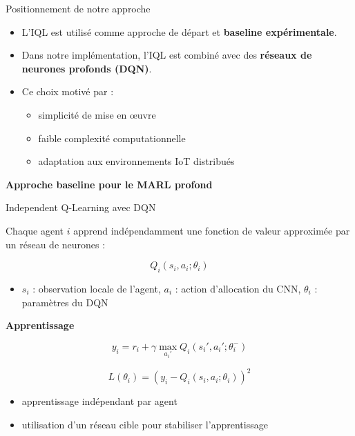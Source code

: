 \documentclass[aspectratio=169]{beamer}
\begin{document}
\begin{frame}{Positionnement de notre approche}

\begin{itemize}
  \item L’IQL est utilisé comme approche de départ et \textbf{baseline expérimentale}.
  \item Dans notre implémentation, l’IQL est combiné avec des \textbf{réseaux de neurones profonds (DQN)}.
  \item Ce choix motivé par :
  \begin{itemize}
    \item simplicité de mise en œuvre
    \item faible complexité computationnelle
    \item adaptation aux environnements IoT distribués
  \end{itemize}
\end{itemize}

\bigskip
\textbf{Approche baseline pour le MARL profond}
\end{frame}

\begin{frame}{Independent Q-Learning avec DQN}

Chaque agent $i$ apprend indépendamment une fonction de valeur
approximée par un réseau de neurones :

\[
Q_i(s_i, a_i; \theta_i)
\]

\begin{itemize}
  \item $s_i$ : observation locale de l’agent, $a_i$ : action d’allocation du CNN, $\theta_i$ : paramètres du DQN
\end{itemize}

\bigskip

\textbf{Apprentissage}

\[
y_i = r_i + \gamma \max_{a_i'} Q_i(s_i',a_i';\theta_i^-)
\]

\[
L(\theta_i) =
\left(
y_i - Q_i(s_i,a_i;\theta_i)
\right)^2
\]

\begin{itemize}
  \item apprentissage indépendant par agent
  \item utilisation d’un réseau cible pour stabiliser l’apprentissage
\end{itemize}

\end{frame}
\end{document}
